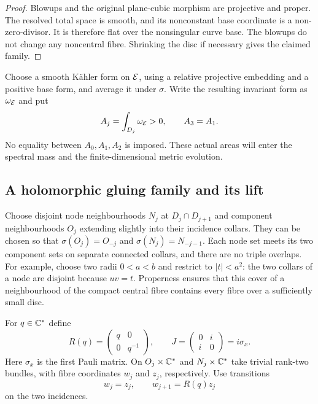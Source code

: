\begin{proof}
Blowups and the original plane-cubic morphism are projective and proper.
The resolved total space is smooth, and its nonconstant base coordinate
is a non-zero-divisor. It is therefore flat over the nonsingular curve
base. The blowups do not change any noncentral fibre. Shrinking the disc
if necessary gives the claimed family.
\end{proof}

Choose a smooth K\"ahler form on $\mathcal E$, using a relative projective
embedding and a positive base form, and average it under $\sigma$.
Write the resulting invariant form as $\omega_{\mathcal E}$ and put
\begin{equation}\label{eq:component-areas}
 A_j=\int_{D_j}\omega_{\mathcal E}>0,\qquad A_3=A_1.
\end{equation}
No equality between $A_0,A_1,A_2$ is imposed. These actual areas will
enter the spectral mass and the finite-dimensional metric evolution.

\subsection{A holomorphic gluing family and its lift}
Choose disjoint node neighbourhoods $N_j$ at $D_j\cap D_{j+1}$ and
component neighbourhoods $O_j$ extending slightly into their incidence
collars. They can be chosen so that
$\sigma(O_j)=O_{-j}$ and $\sigma(N_j)=N_{-j-1}$. Each node set meets
its two component sets on separate connected collars, and there are no
triple overlaps. For example, choose two radii $0<a<b$ and restrict to
$|t|<a^2$: the two collars of a node are disjoint because $uv=t$.
Properness ensures that this cover of a neighbourhood of the compact
central fibre contains every fibre over a sufficiently small disc.

For $q\in\mathbb C^*$ define
\begin{equation}\label{eq:r-j}
 R(q)=\begin{pmatrix}q&0\\0&q^{-1}\end{pmatrix},\qquad
 J=\begin{pmatrix}0&i\\i&0\end{pmatrix}=i\sigma_x.
\end{equation}
Here $\sigma_x$ is the first Pauli matrix. On $O_j\times\mathbb C^*$ and
$N_j\times\mathbb C^*$ take trivial rank-two bundles, with fibre coordinates
$w_j$ and $z_j$, respectively. Use transitions
\begin{equation}\label{eq:incidence-transitions}
 w_j=z_j,\qquad w_{j+1}=R(q)z_j
\end{equation}
on the two incidences.

